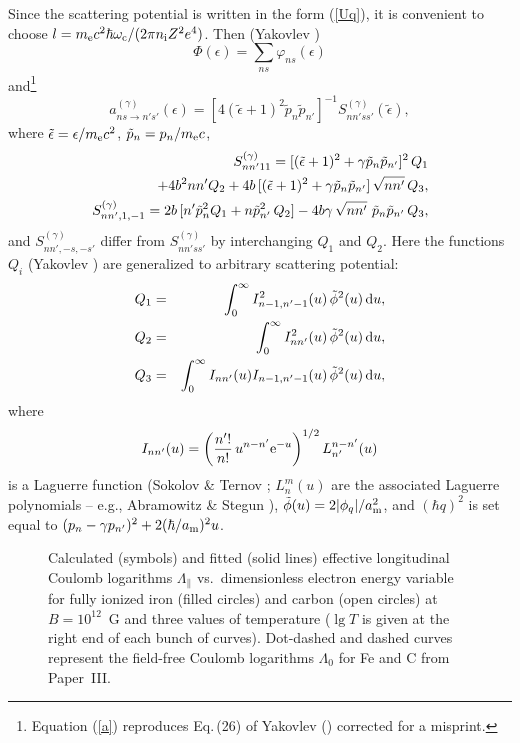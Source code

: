 \documentclass{aa}
\newcommand{\beq}{\begin{equation}}
\newcommand{\eeq}{\end{equation}}
\newcommand{\req}[1]{Eq.~(\ref{#1})}
\newcommand{\omc}{\omega_{\rm c}}
\newcommand{\mel}{m_{\rm e}}
\newcommand{\am}{a_{\rm m}}
\begin{document}
Since the scattering potential is written in the form (\ref{Uq}),
it is convenient to choose
$l = \mel c^2 \hbar\omc / (2\pi n_{\rm i} Z^2 e^4)$.
Then (Yakovlev \cite{yak84})
\beq
   \Phi(\epsilon) = \sum_{ns} \varphi_{ns}(\epsilon)
\eeq
and\footnote{%
Equation (\ref{a}) reproduces Eq.\,(26) of Yakovlev (\cite{yak84})
corrected for a misprint.
}
\beq
   a^{(\gamma)}_{ns\to n's'}(\epsilon) =
       [4(\tilde\epsilon+1)^2 \tilde p_n \tilde p_{n'}]^{-1}
      S^{(\gamma)}_{nn'ss'}(\tilde\epsilon),
\label{a}
\eeq
where $\tilde\epsilon=\epsilon/\mel c^2$,
$\tilde p_n = p_n/\mel c$,
\begin{eqnarray}
&&\hspace*{-.9em}
   S^{(\gamma)}_{nn'11} = [(\tilde\epsilon+1)^2
                 + \gamma \tilde p_n \tilde p_{n'} ]^2\, Q_1
\nonumber\\&&\qquad\quad
        + 4b^2nn'Q_2
        + 4b\,[(\tilde\epsilon+1)^2
                 + \gamma \tilde p_n \tilde p_{n'} ]\,\sqrt{nn'}\,Q_3,
\nonumber\\&&\hspace*{-.9em}
   S^{(\gamma)}_{nn',1,-1} =
      2b\,[n'\tilde p_n^2 Q_1 + n\tilde p_{n'}^2\, Q_2 ] - 4b\gamma
         \,\sqrt{nn'}\,\,\tilde p_n \tilde p_{n'}\, Q_3 ,
\nonumber
\end{eqnarray}
and
$S^{(\gamma)}_{nn',-s,-s'}$ differ from $S^{(\gamma)}_{nn'ss'}$
by interchanging $Q_1$ and $Q_2$.
Here the functions $Q_i$ (Yakovlev \cite{yak84})
are generalized to arbitrary scattering potential:
\begin{eqnarray}
   Q_1 & = &
   \int_0^\infty I_{n-1,n'-1}^2(u)\,\tilde\phi^2(u)\,{\rm d}u ,
\label{Q1}
\\
   Q_2 & = &
   \int_0^\infty I_{nn'}^2(u)\,\tilde\phi^2(u)\,{\rm d}u ,
\label{Q2}
\\
   Q_3 & = &
   \int_0^\infty I_{nn'}(u)I_{n-1,n'-1}(u)\,\tilde\phi^2(u)\,{\rm d}u ,
\label{Q3}
\end{eqnarray}
where
\beq
   I_{nn'}(u) = \left({n'!\over n!}\,u^{n-n'}{\rm e}^{-u}\right)^{1/2} 
       L_{n'}^{n-n'}(u)
\eeq
is a Laguerre function
(Sokolov \& Ternov \cite{SokTer};
$L_n^m(u)$ are the associated Laguerre polynomials -- 
e.g., Abramowitz \& Stegun \cite{Abramowitz}),
$\tilde\phi(u) = 2|\phi_q|/\am^2$,
and
$(\hbar q)^2$ is set equal to
$(p_n-\gamma p_{n'})^2+2(\hbar/\am)^2 u$.

\begin{figure}
\begin{center}
 \leavevmode
\epsfysize=83mm
\end{center}
\caption[]{Calculated (symbols)
and fitted (solid lines) effective longitudinal
Coulomb logarithms $\Lambda_\|$
vs.\ dimensionless electron energy variable \protect{\req{nu}}
for fully ionized iron
(filled circles) and carbon (open circles)
at $B=10^{12}$~G and three values of temperature
($\lg T$ is given at the right end of each bunch of curves).
Dot-dashed and dashed curves represent
the field-free Coulomb logarithms $\Lambda_0$
for Fe and C from Paper~III.
}
\label{fig-b12}
\end{figure}
\end{document}
